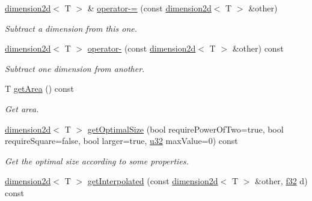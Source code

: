 \begin{DoxyCompactItemize}
\mbox{\label{classirr_1_1core_1_1dimension2d_af5bb67163a3cdbcbceb9eda015382bfe}} 
\hyperlink{classirr_1_1core_1_1dimension2d}{dimension2d}$<$ T $>$ \& \hyperlink{classirr_1_1core_1_1dimension2d_af5bb67163a3cdbcbceb9eda015382bfe}{operator-\/=} (const \hyperlink{classirr_1_1core_1_1dimension2d}{dimension2d}$<$ T $>$ \&other)
\begin{DoxyCompactList}\small\item\em Subtract a dimension from this one. \end{DoxyCompactList}\item 
\mbox{\label{classirr_1_1core_1_1dimension2d_aec5df4b45e5af7fa0fe13f2b0c6d5976}} 
\hyperlink{classirr_1_1core_1_1dimension2d}{dimension2d}$<$ T $>$ \hyperlink{classirr_1_1core_1_1dimension2d_aec5df4b45e5af7fa0fe13f2b0c6d5976}{operator-\/} (const \hyperlink{classirr_1_1core_1_1dimension2d}{dimension2d}$<$ T $>$ \&other) const
\begin{DoxyCompactList}\small\item\em Subtract one dimension from another. \end{DoxyCompactList}\item 
\mbox{\label{classirr_1_1core_1_1dimension2d_a320dee7a21500fd4625ab7660a33248b}} 
T \hyperlink{classirr_1_1core_1_1dimension2d_a320dee7a21500fd4625ab7660a33248b}{get\+Area} () const
\begin{DoxyCompactList}\small\item\em Get area. \end{DoxyCompactList}\item 
\hyperlink{classirr_1_1core_1_1dimension2d}{dimension2d}$<$ T $>$ \hyperlink{classirr_1_1core_1_1dimension2d_a5861f95f79fe5a23a0f2d867b6ca70fc}{get\+Optimal\+Size} (bool require\+Power\+Of\+Two=true, bool require\+Square=false, bool larger=true, \hyperlink{namespaceirr_a0416a53257075833e7002efd0a18e804}{u32} max\+Value=0) const
\begin{DoxyCompactList}\small\item\em Get the optimal size according to some properties. \end{DoxyCompactList}\item 
\hyperlink{classirr_1_1core_1_1dimension2d}{dimension2d}$<$ T $>$ \hyperlink{classirr_1_1core_1_1dimension2d_a30981123f90a2221acd85c1fe4364eee}{get\+Interpolated} (const \hyperlink{classirr_1_1core_1_1dimension2d}{dimension2d}$<$ T $>$ \&other, \hyperlink{namespaceirr_a0277be98d67dc26ff93b1a6a1d086b07}{f32} d) const

\end{DoxyCompactItemize}
